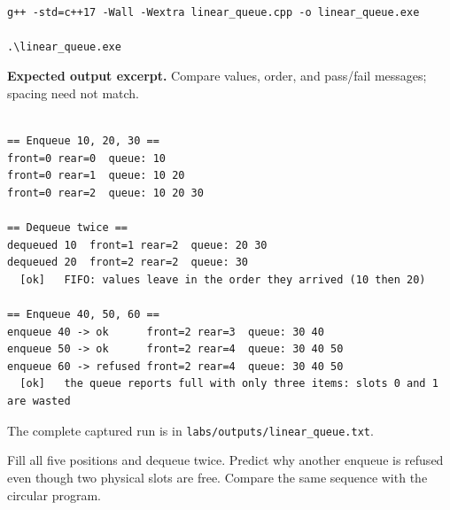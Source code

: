 \begin{lstlisting}[style=utpterminal,language={}]

g++ -std=c++17 -Wall -Wextra linear_queue.cpp -o linear_queue.exe

.\linear_queue.exe

\end{lstlisting}

\textbf{Expected output excerpt.} Compare values, order, and pass/fail messages; spacing need not match.

\begin{lstlisting}[style=utpterminal,language={}]

== Enqueue 10, 20, 30 ==
front=0 rear=0  queue: 10 
front=0 rear=1  queue: 10 20 
front=0 rear=2  queue: 10 20 30 

== Dequeue twice ==
dequeued 10  front=1 rear=2  queue: 20 30 
dequeued 20  front=2 rear=2  queue: 30 
  [ok]   FIFO: values leave in the order they arrived (10 then 20)

== Enqueue 40, 50, 60 ==
enqueue 40 -> ok      front=2 rear=3  queue: 30 40 
enqueue 50 -> ok      front=2 rear=4  queue: 30 40 50 
enqueue 60 -> refused front=2 rear=4  queue: 30 40 50 
  [ok]   the queue reports full with only three items: slots 0 and 1 are wasted

\end{lstlisting}

The complete captured run is in \texttt{labs/outputs/linear\_queue.txt}.

\begin{tryit}

Fill all five positions and dequeue twice. Predict why another enqueue is refused even though two physical slots are free. Compare the same sequence with the circular program.

\end{tryit}
